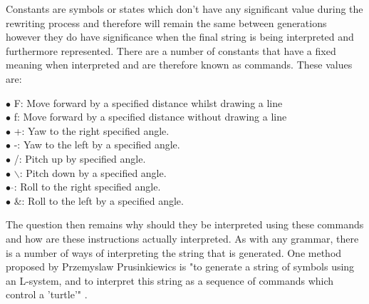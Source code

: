 \begin{flushleft}

Constants are symbols or states which don't have any significant value during the rewriting process and therefore will remain the same between generations however they do have significance when the final string is being interpreted and furthermore represented. There are a number of constants that have a fixed meaning when interpreted and are therefore known as commands. These values are:

\vspace{5mm}

$\bullet$ F: 				\hspace{10mm}  		Move forward by a specified distance whilst drawing a line \\
$\bullet$ f: 				\hspace{10mm} 		Move forward by a specified distance without drawing a line \\
$\bullet$ +: 				\hspace{10mm} 		Yaw to the right specified angle. \\
$\bullet$ -: 				\hspace{10mm} 		Yaw to the left by a specified angle.  \\
$\bullet$ /: 				\hspace{10mm} 		Pitch up by specified angle. \\
$\bullet$ $\backslash$: 	\hspace{10mm} 		Pitch down by a specified angle.  \\
$\bullet$ $\hat{}$: 		\hspace{10mm} 		Roll to the right specified angle. \\
$\bullet$ \&:				\hspace{10mm}  		Roll to the left by a specified angle.  \\

\vspace{5mm}

The question then remains why should they be interpreted using these commands and how are these instructions actually interpreted. As with any grammar, there is a number of ways of interpreting the string that is generated. One method proposed by Przemyslaw Prusinkiewics is "to generate a string of symbols using an L-system, and to interpret this string as a sequence of commands which control a 'turtle'" \cite{prusinkiewicz1986graphical}.\\

\vspace{5mm}


\end{flushleft}
